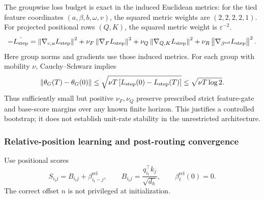 The groupwise loss budget is exact in the induced Euclidean metrics:
for the tied feature coordinates $(a,\beta,b,\omega,v)$, the squared
metric weights are $(2,2,2,2,1)$. For projected positional rows $(Q,K)$,
the squared metric weight is $\varepsilon^{-2}$.
\begin{equation}\label{eq:lr-mobility-budget}
 -\dot{L_{\mathrm{step}}}=
 \left\lVert \nabla_{c,u}L_{\mathrm{step}}\right\rVert^2
 +\nu_F\left\lVert \nabla_FL_{\mathrm{step}}\right\rVert^2
 +\nu_Q\left\lVert \nabla_{Q,K}L_{\mathrm{step}}\right\rVert^2
 +\nu_R\left\lVert \nabla_{\beta^{\mathrm{rel}}}L_{\mathrm{step}}\right\rVert^2.
\end{equation}
Here group norms and gradients use those induced metrics. For each group
with mobility $\nu$, Cauchy--Schwarz implies
\begin{equation}\label{eq:lr-movement-budget}
 \left\lVert \theta_G(T)-\theta_G(0)\right\rVert
 \le\sqrt{\nu T\,[L_{\mathrm{step}}(0)-L_{\mathrm{step}}(T)]}
 \le\sqrt{\nu T\log2}.
\end{equation}
Thus sufficiently small but positive $\nu_F,\nu_Q$ preserve prescribed
strict feature-gate and base-score margins over any known finite horizon.
This justifies a controlled bootstrap; it does not establish unit-rate
stability in the unrestricted architecture.

\subsubsection{Relative-position learning and post-routing convergence}
\label{app:weak-routing-convergence}

Use positional scores
\begin{equation}\label{eq:lr-relative-scores}
 S_{i_tj}=B_{i_tj}+\beta_{i_t-j}^{\mathrm{rel}},
 \qquad
 B_{i_tj}=\frac{q_{i_t}^\top k_j}{\sqrt{d_h}},
 \qquad \beta_\ell^{\mathrm{rel}}(0)=0.
\end{equation}
The correct offset $n$ is not privileged at initialization.

